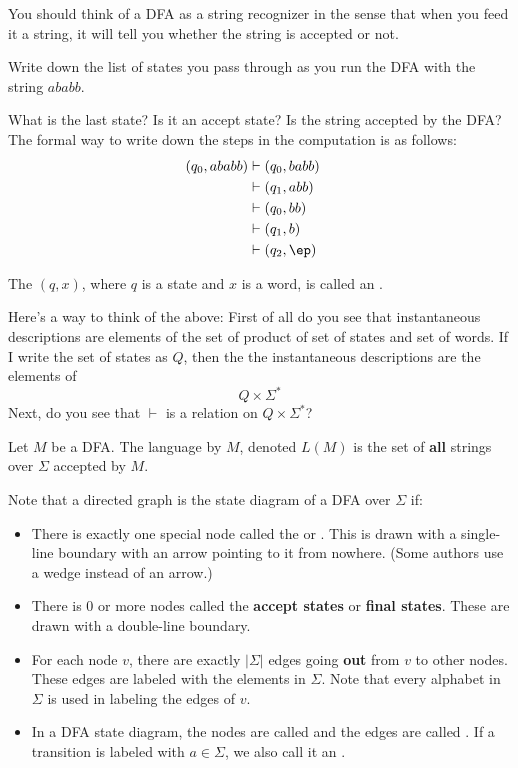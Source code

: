 You should think of a DFA as a string recognizer in the sense that
when you feed it a string, it will tell you whether the string is
accepted or not.


\begin{eg}
Write down the list of states you pass through as you run the DFA
with the string $ababb$.

What is the last state? Is it an
accept state? Is the string accepted by the DFA?
The formal way to write down the steps in the computation is as
follows:
\begin{align*}
 (q_0, ababb)
 &\vdash (q_0,babb) \cr
 &\vdash (q_1,abb) \cr
 &\vdash (q_0,bb) \cr
 &\vdash (q_1,b) \cr
 &\vdash (q_2,\ep) \cr
\end{align*}
\end{eg}

The $(q, x)$, where $q$ is a state and $x$ is a word, is called an
.

Here's a way to
think of the above:
First of all do you see that instantaneous descriptions are elements of the
set of product of set of states and set of words.
If I write the set of states as $Q$, then the the instantaneous
descriptions are the elements of 
\[
Q \times \Sigma^*
\]
Next, do you see that $\vdash$ is a relation on $Q \times \Sigma^*$?

\begin{defn}
Let $M$ be a DFA. The language  by $M$, denoted
$L(M)$ is the set of
\textbf{all} strings over $\Sigma$ accepted by
$M$.
\end{defn}

Note that a directed graph is the state diagram of a DFA over
$\Sigma$ if: 
\begin{itemize}

\item There is exactly one special node called the
   or
  .
 This is drawn with a single-line boundary with an arrow pointing to it from nowhere.
 (Some authors use a wedge instead of an arrow.)

 \item There is 0 or more nodes called the
   \textbf{accept states} or
   \textbf{final states}.
 These are drawn with a double-line boundary.

 \item For each node $v$, there are exactly $|\Sigma|$ edges going
 \textbf{out} from $v$ to other nodes. These edges are labeled with the
 elements in $\Sigma$. Note that every alphabet in $\Sigma$ is used
 in labeling the edges of $v$.

 \item In a DFA state diagram, the nodes are called  and the
 edges are called . If a transition is labeled
 with $a \in \Sigma$, we also call it an .

\end{itemize}

